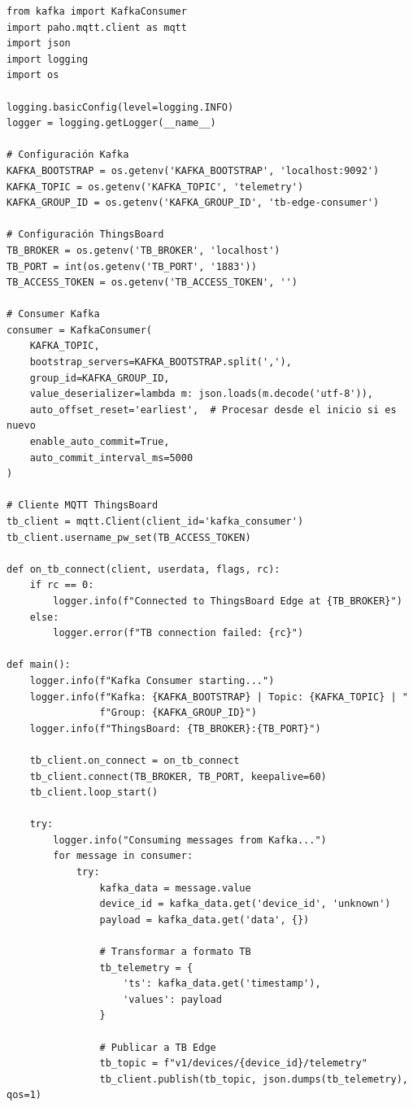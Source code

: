 \begin{verbatim}
from kafka import KafkaConsumer
import paho.mqtt.client as mqtt
import json
import logging
import os

logging.basicConfig(level=logging.INFO)
logger = logging.getLogger(__name__)

# Configuración Kafka
KAFKA_BOOTSTRAP = os.getenv('KAFKA_BOOTSTRAP', 'localhost:9092')
KAFKA_TOPIC = os.getenv('KAFKA_TOPIC', 'telemetry')
KAFKA_GROUP_ID = os.getenv('KAFKA_GROUP_ID', 'tb-edge-consumer')

# Configuración ThingsBoard
TB_BROKER = os.getenv('TB_BROKER', 'localhost')
TB_PORT = int(os.getenv('TB_PORT', '1883'))
TB_ACCESS_TOKEN = os.getenv('TB_ACCESS_TOKEN', '')

# Consumer Kafka
consumer = KafkaConsumer(
    KAFKA_TOPIC,
    bootstrap_servers=KAFKA_BOOTSTRAP.split(','),
    group_id=KAFKA_GROUP_ID,
    value_deserializer=lambda m: json.loads(m.decode('utf-8')),
    auto_offset_reset='earliest',  # Procesar desde el inicio si es nuevo
    enable_auto_commit=True,
    auto_commit_interval_ms=5000
)

# Cliente MQTT ThingsBoard
tb_client = mqtt.Client(client_id='kafka_consumer')
tb_client.username_pw_set(TB_ACCESS_TOKEN)

def on_tb_connect(client, userdata, flags, rc):
    if rc == 0:
        logger.info(f"Connected to ThingsBoard Edge at {TB_BROKER}")
    else:
        logger.error(f"TB connection failed: {rc}")

def main():
    logger.info(f"Kafka Consumer starting...")
    logger.info(f"Kafka: {KAFKA_BOOTSTRAP} | Topic: {KAFKA_TOPIC} | "
                f"Group: {KAFKA_GROUP_ID}")
    logger.info(f"ThingsBoard: {TB_BROKER}:{TB_PORT}")
    
    tb_client.on_connect = on_tb_connect
    tb_client.connect(TB_BROKER, TB_PORT, keepalive=60)
    tb_client.loop_start()
    
    try:
        logger.info("Consuming messages from Kafka...")
        for message in consumer:
            try:
                kafka_data = message.value
                device_id = kafka_data.get('device_id', 'unknown')
                payload = kafka_data.get('data', {})
                
                # Transformar a formato TB
                tb_telemetry = {
                    'ts': kafka_data.get('timestamp'),
                    'values': payload
                }
                
                # Publicar a TB Edge
                tb_topic = f"v1/devices/{device_id}/telemetry"
                tb_client.publish(tb_topic, json.dumps(tb_telemetry), qos=1)
                

\end{verbatim}
